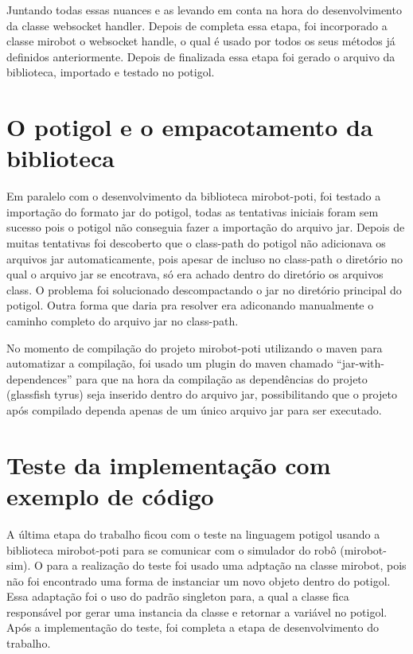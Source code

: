 Juntando todas essas nuances e as levando em conta na hora do desenvolvimento
da classe websocket handler. Depois de completa essa etapa, foi incorporado a
classe mirobot o websocket handle, o qual é usado por todos os seus métodos já
definidos anteriormente. Depois de finalizada essa etapa foi gerado o arquivo
da biblioteca, importado e testado no potigol.

\section{O potigol e o empacotamento da biblioteca}
\label{sec:empacotamento}

Em paralelo com o desenvolvimento da biblioteca mirobot-poti, foi testado a
importação do formato jar do potigol, todas as tentativas iniciais foram sem
sucesso pois o potigol não conseguia fazer a importação do arquivo jar. Depois
de muitas tentativas foi descoberto que o class-path do potigol não adicionava
os arquivos jar automaticamente, pois apesar de incluso no class-path o
diretório no qual o arquivo jar se encotrava, só era achado dentro do diretório
os arquivos class. O problema foi solucionado descompactando o jar no diretório
principal do potigol. Outra forma que daria pra resolver era adiconando
manualmente o caminho completo do arquivo jar no class-path.

No momento de compilação do projeto mirobot-poti utilizando o maven para
automatizar a compilação, foi usado um plugin do maven chamado
``jar-with-dependences'' para que na hora da compilação as dependências do
projeto (glassfish tyrus) seja inserido dentro do arquivo jar, possibilitando
que o projeto após compilado dependa apenas de um único arquivo jar para ser
executado.

\section{Teste da implementação com exemplo de código}
\label{sec:teste}

A última etapa do trabalho ficou com o teste na linguagem potigol usando a
biblioteca mirobot-poti para se comunicar com o simulador do robô
(mirobot-sim). O para a realização do teste foi usado uma adptação na classe
mirobot, pois não foi encontrado uma forma de instanciar um novo objeto dentro
do potigol. Essa adaptação foi o uso do padrão singleton para, a qual a classe
fica responsável por gerar uma instancia da classe e retornar a variável no
potigol. Após a implementação do teste, foi completa a etapa de desenvolvimento
do trabalho.

